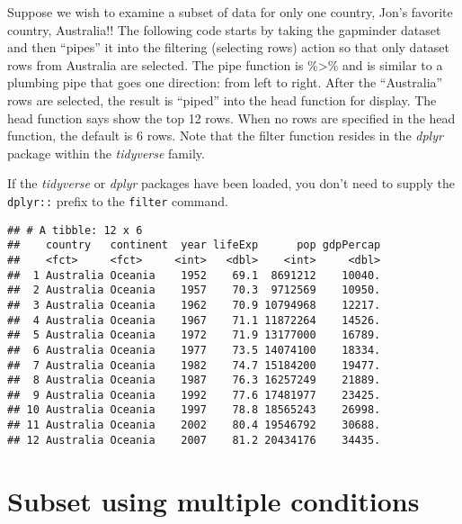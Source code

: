 \documentclass[]{book}
\newenvironment{Shaded}{\begin{snugshade}}{\end{snugshade}}
\newcommand{\KeywordTok}[1]{\textcolor[rgb]{0.13,0.29,0.53}{\textbf{#1}}}
\newcommand{\DataTypeTok}[1]{\textcolor[rgb]{0.13,0.29,0.53}{#1}}
\newcommand{\DecValTok}[1]{\textcolor[rgb]{0.00,0.00,0.81}{#1}}
\newcommand{\StringTok}[1]{\textcolor[rgb]{0.31,0.60,0.02}{#1}}
\newcommand{\CommentTok}[1]{\textcolor[rgb]{0.56,0.35,0.01}{\textit{#1}}}
\newcommand{\OperatorTok}[1]{\textcolor[rgb]{0.81,0.36,0.00}{\textbf{#1}}}
\newcommand{\NormalTok}[1]{#1}
\begin{document}
Suppose we wish to examine a subset of data for only one country, Jon's
favorite country, Australia!! The following code starts by taking the
gapminder dataset and then ``pipes'' it into the filtering (selecting
rows) action so that only dataset rows from Australia are selected. The
pipe function is \%\textgreater{}\% and is similar to a plumbing pipe
that goes one direction: from left to right. After the ``Australia''
rows are selected, the result is ``piped'' into the head function for
display. The head function says show the top 12 rows. When no rows are
specified in the head function, the default is 6 rows. Note that the
filter function resides in the \emph{dplyr} package within the
\emph{tidyverse} family.

If the \emph{tidyverse} or \emph{dplyr} packages have been loaded, you
don't need to supply the \texttt{dplyr::} prefix to the \texttt{filter}
command.

\begin{Shaded}
\end{Shaded}

\begin{verbatim}
## # A tibble: 12 x 6
##    country   continent  year lifeExp      pop gdpPercap
##    <fct>     <fct>     <int>   <dbl>    <int>     <dbl>
##  1 Australia Oceania    1952    69.1  8691212    10040.
##  2 Australia Oceania    1957    70.3  9712569    10950.
##  3 Australia Oceania    1962    70.9 10794968    12217.
##  4 Australia Oceania    1967    71.1 11872264    14526.
##  5 Australia Oceania    1972    71.9 13177000    16789.
##  6 Australia Oceania    1977    73.5 14074100    18334.
##  7 Australia Oceania    1982    74.7 15184200    19477.
##  8 Australia Oceania    1987    76.3 16257249    21889.
##  9 Australia Oceania    1992    77.6 17481977    23425.
## 10 Australia Oceania    1997    78.8 18565243    26998.
## 11 Australia Oceania    2002    80.4 19546792    30688.
## 12 Australia Oceania    2007    81.2 20434176    34435.
\end{verbatim}

\section{Subset using multiple
conditions}\label{subset-using-multiple-conditions}
\end{document}
